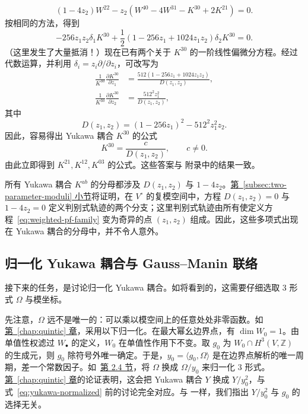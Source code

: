 \begin{example}
\[
(1-4z_2)W^{22}-z_2(W^{40}-4W^{31}-K^{30}+2K^{21})=0.
\]
按相同的方法，得到
\[
-256z_1z_2\delta_1K^{30}
+\frac12(1-256z_1+1024z_1z_2)\delta_2K^{30}=0.
\]
（这里发生了大量抵消！）现在已有两个关于 $K^{30}$ 的一阶线性偏微分方程。经过代数运算，并利用 $\delta_i=z_i\partial/\partial z_i$，可改写为
\[
\begin{aligned}
\frac1{K^{30}}\frac{\partial K^{30}}{\partial z_1}
&=\frac{512(1-256z_1+1024z_1z_2)}{D(z_1,z_2)},\\
\frac1{K^{30}}\frac{\partial K^{30}}{\partial z_2}
&=\frac{512^2z_1^2}{D(z_1,z_2)},
\end{aligned}
\]
其中
\[
D(z_1,z_2)=(1-256z_1)^2-512^2z_1^2z_2.
\]
因此，容易得出 Yukawa 耦合 $K^{30}$ 的公式
\[
K^{30}=\frac{c}{D(z_1,z_2)},\qquad c\ne0.
\]
由此立即得到 $K^{21},K^{12},K^{03}$ 的公式。这些答案与  附录中的结果一致。

所有 Yukawa 耦合 $K^{ab}$ 的分母都涉及 $D(z_1,z_2)$ 与 $1-4z_2$。\hyperref[subsec:two-parameter-moduli]{第~\ref*{subsec:two-parameter-moduli} 小节}将证明，在 $V^\circ$ 的复模空间中，方程 $D(z_1,z_2)=0$ 与 $1-4z_2=0$ 定义判别式轨迹的两个分支；这里判别式轨迹由所有使定义方程~\eqref{eq:weighted-pf-family} 变为奇异的点 $(z_1,z_2)$ 组成。因此，这些多项式出现在 Yukawa 耦合的分母中，并不令人意外。
\end{example}

\subsection{归一化 Yukawa 耦合与 Gauss--Manin 联络}\label{subsec:normalized-yukawa-connection}

接下来的任务，是讨论归一化 Yukawa 耦合。如将看到的，这需要仔细选取 $3$ 形式 $\Omega$ 与模坐标。

先注意，$\Omega$ 远不是唯一的：可以乘以模空间上的任意处处非零函数。如\hyperref[chap:quintic]{第~\ref*{chap:quintic} 章}，采用以下归一化。在最大幂幺边界点，有 $\dim W_0=1$。由单值性权滤过 $W_\bullet$ 的定义，$W_0$ 在单值性作用下不变。取 $g_0$ 为 $W_0\cap H^3(V,\mathbb Z)$ 的生成元，则 $g_0$ 除符号外唯一确定。于是，$y_0=\langle g_0,\Omega\rangle$ 是在边界点解析的唯一周期，差一个常数因子。如~\hyperref[sec:quintic-b-model]{第 2.4 节}，将 $\Omega$ 换成 $\Omega/y_0$ 来归一化 $3$ 形式。\hyperref[chap:quintic]{第~\ref*{chap:quintic} 章}的论证表明，这会把 Yukawa 耦合 $Y$ 换成 $Y/y_0^2$，与式~\eqref{eq:yukawa-normalized} 前的讨论完全对应。与  一样，我们指出 $Y/y_0^2$ 与 $g_0$ 的选择无关。

